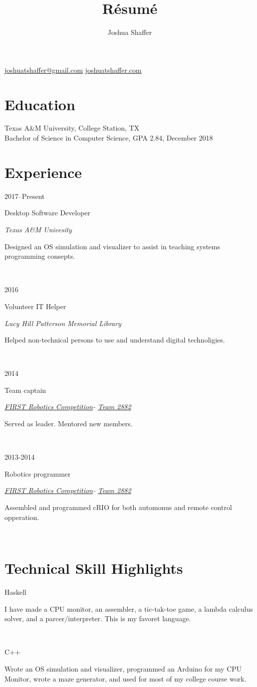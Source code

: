 \documentclass{article}
\title{R\'esum\'e}
\author{Joshua Shaffer}
\newcommand{\entry}[4]{

\begin{minipage}[t]{.15\textwidth}
\hfill #1
\end{minipage}
\hfill\vline\hfill
\begin{minipage}[t]{.80\textwidth}
#2

\textit{#3}

\footnotesize{#4}
\end{minipage}\\\vspace{.25cm}}
\newcommand{\jskill}[2]{

\begin{minipage}[t]{.15\textwidth}
\hfill #1
\end{minipage}
\hfill\vline\hfill
\begin{minipage}[t]{.80\textwidth}
#2
\end{minipage}\\\vspace{.1em}}
\newcommand{\frc}{\href{https://www.firstinspires.org/robotics/frc}{FIRST Robotics Competition}}
\newcommand{\frct}{\href{https://www.thebluealliance.com/team/2882}{Team 2882}}
\begin{document}
\begin{center}
 \begin{minipage}{2in}%
  \begin{center}
   \mbox{\huge\bfseries\theauthor}
   \mbox{\href{mailto:joshuatshaffer@gmail.com}{joshuatshaffer@gmail.com}}
   \mbox{\href{http://joshuatshaffer.com}{joshuatshaffer.com}}
  \end{center}
 \end{minipage}
 \hfill
\end{center}

\section{Education}

\noindent
Texas A\&M University, College Station, TX \\
Bachelor of Science in Computer Science, GPA 2.84, December 2018

\section{Experience}

\noindent
\entry
{2017--Present}
{Desktop Software Developer}
{Texas A\&M Univesity}
{Designed an OS simulation and visualizer to assist in teaching systems programming consepts.}

\entry
{2016}
{Volunteer IT Helper}
{Lucy Hill Patterson Memorial Library}
{Helped non-technical persons to use and understand digital technoligies.}

\entry
{2014}
{Team captain}
{\frc - \frct}
{Served as leader. Mentored new members.}

\entry
{2013-2014}
{Robotics programmer}
{\frc - \frct}
{Assembled and programmed cRIO for both automonus and remote control opperation.}

\section{Technical Skill Highlights}

\noindent
\jskill{Haskell}{I have made a CPU monitor, an assembler, a tic-tak-toe game, a lambda calculus solver, and a parcer/interpreter. This is my favoret language.}

\jskill{C++}{Wrote an OS simulation and visualizer, programmed an Arduino for my CPU Monitor, wrote a maze generator, and used for most of my college course work.}
\end{document}
